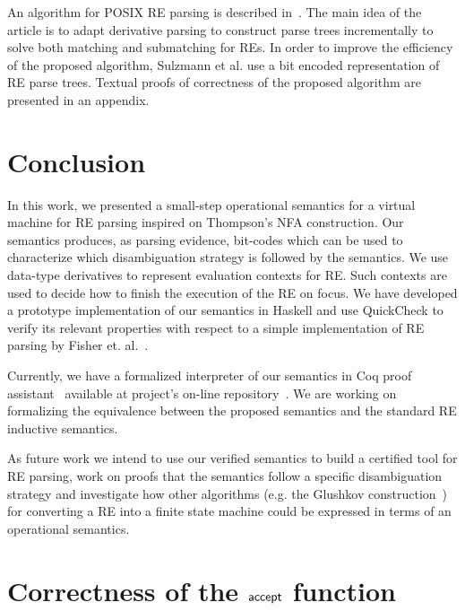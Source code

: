 \documentclass[sigplan]{acmart}
\theoremstyle{definition}
\newcommand{\F}[1]{\green{\mathsf{#1}}}
\begin{document}
An algorithm for POSIX RE parsing is described in~\cite{Sulzmann14}. The main idea of the article is to adapt
derivative parsing to construct parse trees incrementally to solve both matching and submatching for REs. In order to improve the
efficiency of the proposed algorithm, Sulzmann et al. use a bit encoded representation of RE parse trees. Textual proofs of
correctness of the proposed algorithm are presented in an appendix.

\section{Conclusion}\label{section:conclusion}

In this work, we presented a small-step operational semantics for a virtual machine for RE parsing inspired on
Thompson's NFA construction. Our semantics produces, as parsing evidence, bit-codes which can be used to characterize which
disambiguation strategy is followed by the semantics. We use data-type derivatives to represent evaluation contexts for RE.
Such contexts are used to decide how to finish the execution of the RE on focus. We have developed a prototype implementation
of our semantics in Haskell and use QuickCheck to verify its relevant properties with respect to a simple implementation
of RE parsing by Fisher et. al.~\cite{Fischer2010}.

Currently, we have a formalized interpreter of our semantics in Coq proof assistant~\cite{Bertot2010} available at project's
on-line repository~\cite{regexvm-rep}. We are working on formalizing the equivalence between the proposed semantics and
the standard RE inductive semantics.

As future work we intend to use our verified semantics to build a certified tool for RE
parsing, work on proofs that the semantics follow a specific disambiguation strategy and investigate how other algorithms
(e.g. the Glushkov construction~\cite{Gluskov1961}) for converting a RE into a finite state machine could be expressed in
terms of an operational semantics.




\appendix

\section{Correctness of the \ensuremath{\F{accept}} function}\label{appendix:accept}
\end{document}

